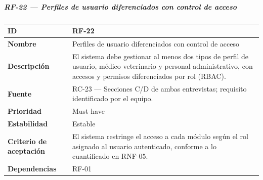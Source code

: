 \documentclass[
]{article}
\newcounter{none} %
\begin{document}
\subparagraph{RF-22 --- Perfiles de usuario diferenciados con control de
acceso}\label{rf-22-perfiles-de-usuario-diferenciados-con-control-de-acceso}

{\def\LTcaptype{none} %
\begin{longtable}[]{@{}
  >{\raggedright\arraybackslash}p{}
  >{\raggedright\arraybackslash}p{}@{}}
\toprule\noalign{}
\begin{minipage}[b]{\linewidth}\raggedright
\textbf{ID}
\end{minipage} & \begin{minipage}[b]{\linewidth}\raggedright
RF-22
\end{minipage} \\
\midrule\noalign{}
\endhead
\bottomrule\noalign{}
\endlastfoot
\textbf{Nombre} & \begin{minipage}[t]{\linewidth}\raggedright
Perfiles de usuario diferenciados con control de acceso
\end{minipage} \\
\textbf{Descripción} & \begin{minipage}[t]{\linewidth}\raggedright
El sistema debe gestionar al menos dos tipos de perfil de usuario,
médico veterinario y personal administrativo, con accesos y permisos
diferenciados por rol (RBAC).
\end{minipage} \\
\textbf{Fuente} & \begin{minipage}[t]{\linewidth}\raggedright
RC-23 --- Secciones C/D de ambas entrevistas; requisito identificado por
el equipo.
\end{minipage} \\
\textbf{Prioridad} & \begin{minipage}[t]{\linewidth}\raggedright
Must have
\end{minipage} \\
\textbf{Estabilidad} & \begin{minipage}[t]{\linewidth}\raggedright
Estable
\end{minipage} \\
\textbf{Criterio de aceptación} &
\begin{minipage}[t]{\linewidth}\raggedright
El sistema restringe el acceso a cada módulo según el rol asignado al
usuario autenticado, conforme a lo cuantificado en RNF-05.
\end{minipage} \\
\textbf{Dependencias} & \begin{minipage}[t]{\linewidth}\raggedright
RF-01
\end{minipage} \\
\end{longtable}
}
\end{document}
